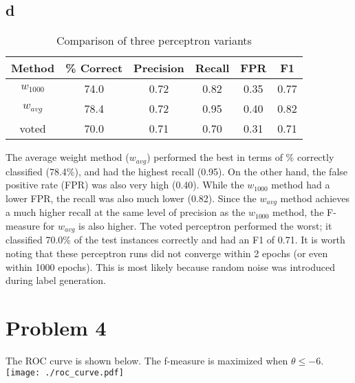 \documentclass{article}
\begin{document}
\subsection*{d}
\begin{table}[ht]
\caption{Comparison of three perceptron variants}
\centering
\begin{tabular}{c c c c c c}
\hline\hline
Method & \% Correct & Precision & Recall & FPR & F1\\ [0.5ex]
\hline
$w_{1000}$ & 74.0 & 0.72 & 0.82 & 0.35 & 0.77 \\ 
$w_{avg}$ & 78.4 & 0.72 & 0.95 & 0.40 & 0.82 \\
voted & 70.0 & 0.71 & 0.70 & 0.31 & 0.71 \\
\hline
\end{tabular}
\label{table:table3d} 
\end{table}

The average weight method ($w_{avg}$) performed the best in terms of \% correctly classified (78.4\%), and had the highest recall (0.95). On the other hand, the false positive rate (FPR) was also very high (0.40). While the $w_{1000}$ method had a lower FPR, the recall was also much lower (0.82). Since the $w_{avg}$ method achieves a much higher recall at the same level of precision as the $w_{1000}$ method, the F-measure for $w_{avg}$ is also higher. The voted perceptron performed the worst; it classified 70.0\% of the test instances correctly and had an F1 of 0.71. It is worth noting that these perceptron runs did not converge within 2 epochs (or even within 1000 epochs). This is most likely because random noise was introduced during label generation.\\

\section*{Problem 4}
The ROC curve is shown below. The f-measure is maximized when $\theta \le -6$.\\
\texttt{[image: ./roc\_curve.pdf]}
\end{document}
